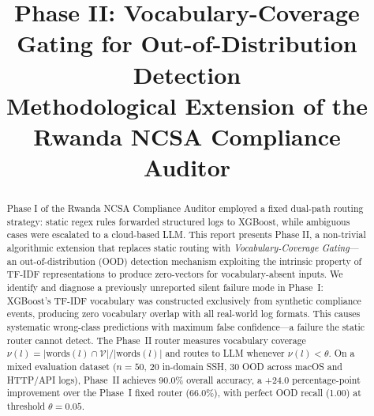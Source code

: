 \documentclass[11pt,conference]{IEEEtran}
\begin{document}
\title{Phase II: Vocabulary-Coverage Gating for Out-of-Distribution Detection\\
{\large Methodological Extension of the Rwanda NCSA Compliance Auditor}}

\author{%
\and
{}
}

\maketitle

\begin{abstract}
Phase I of the Rwanda NCSA Compliance Auditor employed a fixed dual-path
routing strategy: static regex rules forwarded structured logs to XGBoost,
while ambiguous cases were escalated to a cloud-based LLM. This report
presents Phase II, a non-trivial algorithmic extension that replaces static
routing with \emph{Vocabulary-Coverage Gating}---an out-of-distribution
(OOD) detection mechanism exploiting the intrinsic property of TF-IDF
representations to produce zero-vectors for vocabulary-absent inputs. We
identify and diagnose a previously unreported silent failure mode in Phase~I:
XGBoost's TF-IDF vocabulary was constructed exclusively from synthetic
compliance events, producing zero vocabulary overlap with all real-world log
formats. This causes systematic wrong-class predictions with maximum false
confidence---a failure the static router cannot detect. The Phase~II router
measures vocabulary coverage $\nu(l) = |\text{words}(l) \cap \mathcal{V}| /
|\text{words}(l)|$ and routes to LLM whenever $\nu(l) < \theta$. On a
mixed evaluation dataset ($n=50$, 20 in-domain SSH, 30 OOD across macOS and
HTTP/API logs), Phase~II achieves 90.0\% overall accuracy, a +24.0
percentage-point improvement over the Phase~I fixed router (66.0\%), with
perfect OOD recall (1.00) at threshold $\theta=0.05$.
\end{abstract}
\end{document}
